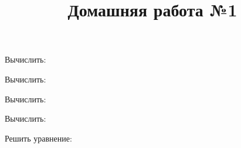 \newpage
\title{Домашняя работа №1}
\begin{listofex}
	\item Вычислить:
	\begin{enumcols}[itemcolumns=4]
		\item {}
		\item {}
		\item {}
		\item {}
		\item {}
		\item {}
		\item {}
		\item {}
	\end{enumcols}
	\item Вычислить:
	\begin{enumcols}[itemcolumns=2]
		\item {}
		\item {}
		\item {}
		\item {}
	\end{enumcols}
	\item Вычислить:
	\begin{enumcols}[itemcolumns=3]
		\item {}
		\item {}
		\item {}
	\end{enumcols}
	\item Вычислить:
	\begin{enumcols}[itemcolumns=2]
		\item {}
		\item {}
		\item {}
		\item {}
	\end{enumcols}
	\item Решить уравнение:
	\begin{enumcols}[itemcolumns=2]
		\item {}
		\item {}
		\item {}
		\item {}
		\item {}
		\item {}
		\item {}
	\end{enumcols}
\end{listofex}
